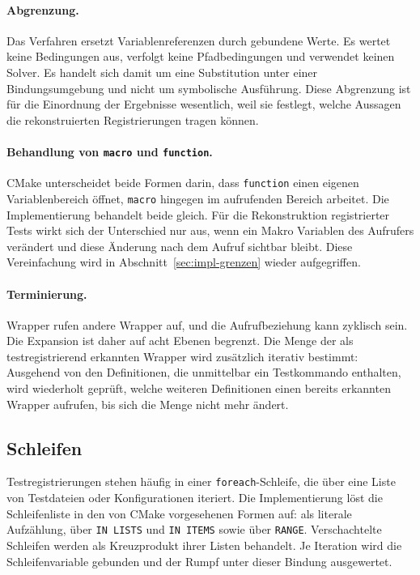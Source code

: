 \documentclass[12pt,a4paper,twoside,headsepline,parskip=half]{scrreprt}
\begin{document}
\paragraph{Abgrenzung.}
Das Verfahren ersetzt Variablenreferenzen durch gebundene Werte. Es wertet keine
Bedingungen aus, verfolgt keine Pfadbedingungen und verwendet keinen Solver. Es
handelt sich damit um eine Substitution unter einer Bindungsumgebung und nicht um
symbolische Ausführung. Diese Abgrenzung ist für die Einordnung der Ergebnisse
wesentlich, weil sie festlegt, welche Aussagen die rekonstruierten Registrierungen
tragen können.

\paragraph{Behandlung von \texttt{macro} und \texttt{function}.}
CMake unterscheidet beide Formen darin, dass \texttt{function} einen eigenen
Variablenbereich öffnet, \texttt{macro} hingegen im aufrufenden Bereich arbeitet. Die
Implementierung behandelt beide gleich. Für die Rekonstruktion registrierter Tests
wirkt sich der Unterschied nur aus, wenn ein Makro Variablen des Aufrufers verändert
und diese Änderung nach dem Aufruf sichtbar bleibt. Diese Vereinfachung wird in
Abschnitt~\ref{sec:impl-grenzen} wieder aufgegriffen.

\paragraph{Terminierung.}
Wrapper rufen andere Wrapper auf, und die Aufrufbeziehung kann zyklisch sein. Die
Expansion ist daher auf acht Ebenen begrenzt. Die Menge der als testregistrierend
erkannten Wrapper wird zusätzlich iterativ bestimmt: Ausgehend von den Definitionen,
die unmittelbar ein Testkommando enthalten, wird wiederholt geprüft, welche weiteren
Definitionen einen bereits erkannten Wrapper aufrufen, bis sich die Menge nicht mehr
ändert.

\subsection{Schleifen}
\label{sec:impl-schleifen}

Testregistrierungen stehen häufig in einer \texttt{foreach}-Schleife, die über eine
Liste von Testdateien oder Konfigurationen iteriert. Die Implementierung löst die
Schleifenliste in den von CMake vorgesehenen Formen auf: als literale Aufzählung,
über \texttt{IN LISTS} und \texttt{IN ITEMS} sowie über \texttt{RANGE}.
Verschachtelte Schleifen werden als Kreuzprodukt ihrer Listen behandelt. Je Iteration
wird die Schleifenvariable gebunden und der Rumpf unter dieser Bindung ausgewertet.
\end{document}
